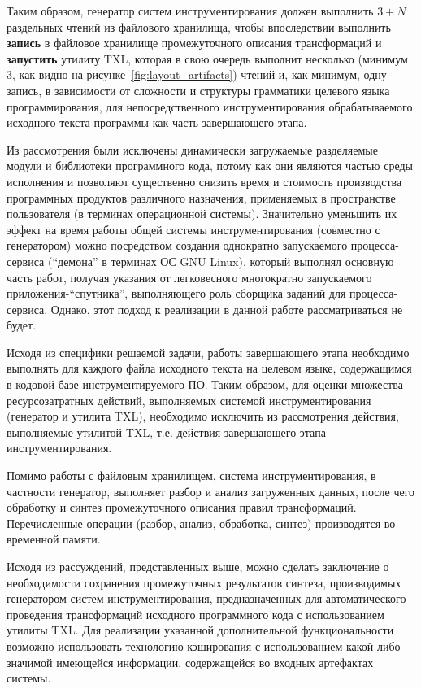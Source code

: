 Таким образом, генератор систем инструментирования должен выполнить $3 + N$ раздельных чтений из файлового хранилища, чтобы впоследствии выполнить \textbf{запись} в файловое хранилище промежуточного описания трансформаций и \textbf{запустить} утилиту TXL, которая в свою очередь выполнит несколько (минимум $3$, как видно на рисунке~\ref{fig:layout_artifacts}) чтений и, как минимум, одну запись, в зависимости от сложности и структуры грамматики целевого языка программирования, для непосредственного инструментирования обрабатываемого исходного текста программы как часть завершающего этапа.

Из рассмотрения были исключены динамически загружаемые разделяемые модули и библиотеки программного кода, потому как они являются частью среды исполнения и позволяют существенно снизить время и стоимость производства программных продуктов различного назначения, применяемых в пространстве пользователя (в терминах операционной системы).
Значительно уменьшить их эффект на время работы общей системы инструментирования (совместно с генератором) можно посредством создания однократно запускаемого процесса-сервиса (``демона'' в терминах ОС GNU Linux), который выполнял основную часть работ, получая указания от легковесного многократно запускаемого приложения-``спутника'', выполняющего роль сборщика заданий для процесса-сервиса.
Однако, этот подход к реализации в данной работе рассматриваться не будет.


Исходя из специфики решаемой задачи, работы завершающего этапа необходимо выполнять для каждого файла исходного текста на целевом языке, содержащимся в кодовой базе инструментируемого ПО.
Таким образом, для оценки множества ресурсозатратных действий, выполняемых системой инструментирования (генератор и утилита TXL), необходимо исключить из рассмотрения действия, выполняемые утилитой TXL, т.е. действия завершающего этапа инструментирования.

Помимо работы с файловым хранилищем, система инструментирования, в частности генератор, выполняет разбор и анализ загруженных данных, после чего обработку и синтез промежуточного описания правил трансформаций.
Перечисленные операции (разбор, анализ, обработка, синтез) производятся во временной памяти.

Исходя из рассуждений, представленных выше, можно сделать заключение о необходимости сохранения промежуточных результатов синтеза, производимых генератором систем инструментирования, предназначенных для автоматического проведения трансформаций исходного программного кода с использованием утилиты TXL.
Для реализации указанной дополнительной функциональности возможно использовать технологию кэширования с использованием какой-либо значимой имеющейся информации, содержащейся во входных артефактах системы.

